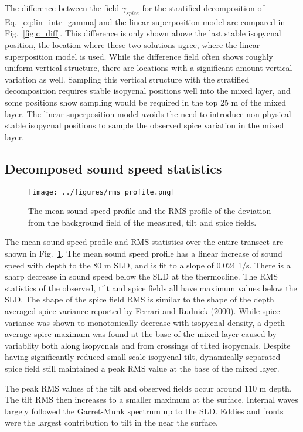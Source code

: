 \documentclass[preprint,NumberedRefs]{JASA}
\begin{document}
The difference between the field $\gamma_{spice}$ for the stratified decomposition of Eq.~\eqref{eq:lin_intr_gamma} and the linear superposition model are compared in Fig.~\ref{fig:c_diff}. This difference is only shown above the last stable isopycnal position, the location where these two solutions agree, where the linear superposition model is used. While the difference field often shows roughly uniform vertical structure, there are locations with a significant amount vertical variation as well. Sampling this vertical structure with the stratified decomposition requires stable isopycnal positions well into the mixed layer, and some positions show sampling would be required in the top 25 m of the mixed layer. The linear superposition model avoids the need to introduce non-physical stable isopycnal positions to sample the observed spice variation in the mixed layer.

\subsection{Decomposed sound speed statistics}
\begin{figure}
\texttt{[image: ../figures/rms\_profile.png]}
    \caption{\label{fig:c_rms}{The mean sound speed profile and the RMS profile of the deviation from the background field of the measured, tilt and spice fields. }}
\end{figure}

The mean sound speed profile and RMS statistics over the entire transect are shown in Fig.~\ref{fig:c_rms}. The mean sound speed profile has a linear increase of sound speed with depth to the 80 m SLD, and is fit to a slope of 0.024 1/s. There is a sharp decrease in sound speed below the SLD at the thermocline. The RMS statistics of the observed, tilt and spice fields all have maximum values below the SLD. The shape of the spice field RMS is similar to the shape of the depth averaged spice variance reported by Ferrari and Rudnick (2000)\citep{ferrari2000}. While spice variance was shown to monotonically decrease with isopycnal density, a dpeth average spice maximum was found at the base of the mixed layer caused by variablity both along isopycnals and from crossings of tilted isopycnals. Despite having significantly reduced small scale isopycnal tilt, dynamically separated spice field still maintained a peak RMS value at the base of the mixed layer.

The peak RMS values of the tilt and observed fields occur around 110 m depth. The tilt RMS then increases to a smaller maximum at the surface. Internal waves largely followed the Garret-Munk spectrum up to the SLD. Eddies and fronts were the largest contribution to tilt in the near the surface.
\end{document}

